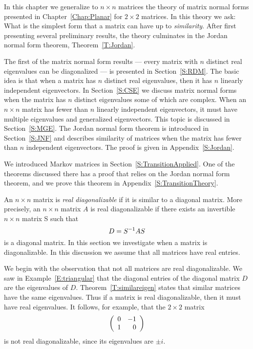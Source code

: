 \label{C:HDeigenvalues}

\normalsize
 
In this chapter we generalize to $n\times n$ matrices the theory of matrix 
normal forms presented in Chapter~\ref{Chap:Planar} for $2\times 2$ 
matrices.  In this theory we ask: What is the simplest form that a matrix 
can have up to {\em similarity\/}.  After first presenting several 
preliminary results, the theory culminates in the Jordan normal form theorem, Theorem~\ref{T:Jordan}. 

The first of the matrix normal form results --- every matrix with 
$n$ distinct real eigenvalues can be diagonalized --- is presented 
in Section~\ref{S:RDM}.  The basic idea is that when a matrix has $n$
distinct real eigenvalues, then it has $n$ linearly independent 
eigenvectors.  In Section~\ref{S:CSE} we discuss matrix normal forms 
when the matrix has $n$ distinct eigenvalues some of which are complex.  
When an $n\times n$ matrix has fewer than $n$ linearly independent 
eigenvectors, it must have multiple eigenvalues and generalized eigenvectors.  
This topic is discussed in Section~\ref{S:MGE}.  The Jordan normal form theorem 
is introduced in Section~\ref{S:JNF} and describes similarity of matrices when 
the matrix has fewer than $n$ independent eigenvectors.  The proof is 
given in Appendix~\ref{S:Jordan}.

We introduced Markov matrices in Section~\ref{S:TransitionApplied}.  
One of the theorems discussed there has a proof that relies on the 
Jordan normal form theorem, and we prove this theorem in 
Appendix~\ref{S:TransitionTheory}.
 




\label{S:RDM}

An $n\times n$ matrix is {\em real diagonalizable\/}
 if it is similar  to a
diagonal matrix.  More precisely, 
an $n\times n$ matrix $A$ is
real diagonalizable if there exists an invertible $n\times n$
matrix S such that
\[
D=S^{-1} AS
\]
is a diagonal matrix.  In this section we investigate when a
matrix is diagonalizable.  In this discussion we assume that all
matrices have real entries.

We begin with the observation that not all matrices are real
diagonalizable.  We saw in Example~\ref{E:triangular} that the
diagonal entries of the diagonal matrix $D$ are the eigenvalues
of $D$. Theorem~\ref{T:similareigen} states that similar
matrices have the same eigenvalues.  Thus if a matrix is real
diagonalizable, then it must have real eigenvalues.  It follows,
for example, that the $2\times 2$ matrix 
\[
\left(\begin{array}{rr} 0 & -1\\ 1 &0\end{array}\right)
\]
is not real diagonalizable, since its eigenvalues are $\pm i$. 

